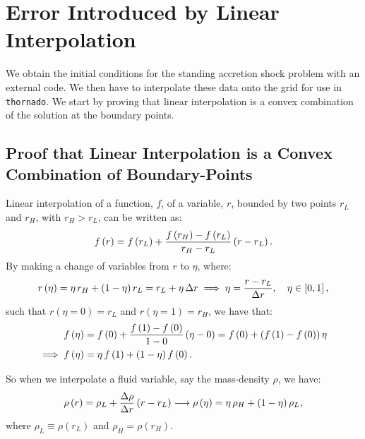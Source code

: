 \section{Error Introduced by Linear Interpolation}
We obtain the initial conditions for the standing accretion shock problem with an external code. We then have to interpolate these data onto the grid for use in \texttt{thornado}. We start by proving that linear interpolation is a convex combination of the solution at the boundary points.

\subsection{Proof that Linear Interpolation is a Convex Combination of Boundary-Points}
Linear interpolation of a function, $f$, of a variable, $r$, bounded by two points $r_{L}$ and $r_{H}$, with $r_{H}>r_{L}$, can be written as:
\begin{equation}
    f\left(r\right)=f\left(r_{L}\right)+\frac{f\left(r_{H}\right)-f\left(r_{L}\right)}{r_{H}-r_{L}}\left(r-r_{L}\right).
\end{equation}
By making a change of variables from $r$ to $\eta$, where:
\begin{equation}
    r\left(\eta\right)=\eta\,r_{H}+\left(1-\eta\right)r_{L}=r_{L}+\eta\,\Delta r\implies\eta=\frac{r-r_{L}}{\Delta r},\hspace{1em}\eta\in\left[0,1\right],
\end{equation}
such that $r\left(\eta=0\right)=r_{L}$ and $r\left(\eta=1\right)=r_{H}$, we have that:
\begin{align}
    f\left(\eta\right)&=f\left(0\right)+\frac{f\left(1\right)-f\left(0\right)}{1-0}\left(\eta-0\right)=f\left(0\right)+\left(f\left(1\right)-f\left(0\right)\right)\eta\\
    \implies f\left(\eta\right)&=\eta\,f\left(1\right)+\left(1-\eta\right)f\left(0\right).
\end{align}

So when we interpolate a fluid variable, say the mass-density $\rho$, we have:
\begin{equation}
    \rho\left(r\right)=\rho_{L}+\frac{\Delta\rho}{\Delta r}\left(r-r_{L}\right)\longrightarrow\rho\left(\eta\right)=\eta\,\rho_{H}+\left(1-\eta\right)\rho_{L},
\end{equation}
where $\rho_{L}\equiv\rho\left(r_{L}\right)$ and $\rho_{H}=\rho\left(r_{H}\right)$.


